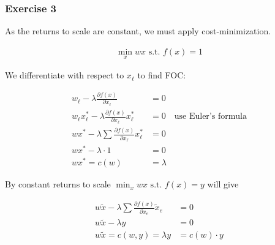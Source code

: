 \subsubsection*{Exercise 3}

As the returns to scale are constant, we must apply cost-minimization.

\begin{align*}
    \min_x wx \text { s.t. } f(x)=1
\end{align*}

We differentiate with respect to $x_\ell$ to find FOC:

\begin{align*}
    w_\ell-\lambda \frac{\partial f(x)}{\partial x_\ell} &= 0 \\
    w_\ell x_\ell^*-\lambda \frac{\partial f(x)}{\partial x_\ell} x_\ell^* &= 0 \quad \text{use Euler's formula} \\
    w x^*-\lambda \sum \frac{\partial f(x)}{\partial x_\ell} x_\ell^* &= 0 \\
    w x^*-\lambda \cdot 1 &= 0 \\
    w x^*=c(w) &= \lambda
\end{align*}

By constant returns to scale $\min _x wx \text { s.t. } f(x)=y$ will give

\begin{align*}
    w \tilde{x}-\lambda \sum \frac{\partial f(x)}{\partial x_e} \tilde{x}_e &= 0 \\
    w \tilde{x}-\lambda y &= 0 \\
    w \tilde{x}=c(w, y)=\lambda y &= c(w) \cdot y
\end{align*}

